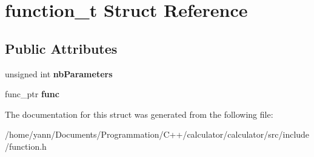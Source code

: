 \hypertarget{structfunction__t}{\section{function\-\_\-t Struct Reference}
\label{structfunction__t}
}
\subsection*{Public Attributes}
\begin{DoxyCompactItemize}
\item 
\hypertarget{structfunction__t_a647add70a5264bc6bea452726cae9591}{unsigned int {\bfseries nb\-Parameters}}\label{structfunction__t_a647add70a5264bc6bea452726cae9591}

\item 
\hypertarget{structfunction__t_a037cf75435952339d3d885e69eddb87e}{func\-\_\-ptr {\bfseries func}}\label{structfunction__t_a037cf75435952339d3d885e69eddb87e}

\end{DoxyCompactItemize}


The documentation for this struct was generated from the following file\-:\begin{DoxyCompactItemize}
\item 
/home/yann/\-Documents/\-Programmation/\-C++/calculator/calculator/src/include/function.\-h\end{DoxyCompactItemize}
